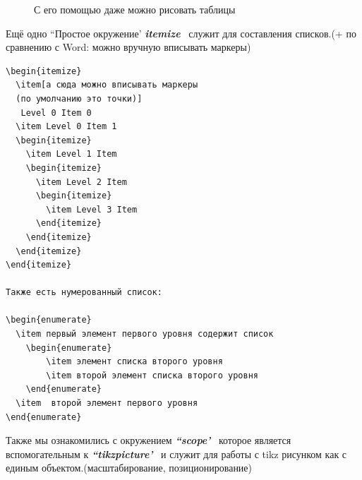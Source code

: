 \documentclass[14pt, a4paper]{extarticle}
\begin{document}
\begin{figure}[h!]
\setlength{\fboxsep}{0pt}%
\setlength{\fboxrule}{2pt}%
%
\caption{С его помощью даже можно рисовать таблицы}
\end{figure}

Ещё одно ``Простое окружение' \textsl{\textbf{itemize}} \ служит для составления списков.(+ по сравнению с Word: можно вручную вписывать маркеры)
\begin{verbatim}
\begin{itemize}
  \item[а сюда можно вписывать маркеры
  (по умолчанию это точки)]
   Level 0 Item 0 
  \item Level 0 Item 1 
  \begin{itemize}
    \item Level 1 Item
    \begin{itemize}
      \item Level 2 Item
      \begin{itemize}
        \item Level 3 Item
      \end{itemize}
    \end{itemize}
  \end{itemize}
\end{itemize}

Также есть нумерованный список:

\begin{enumerate} 
  \item первый элемент первого уровня содержит список 
    \begin{enumerate} 
        \item элемент списка второго уровня
        \item второй элемент списка второго уровня
    \end{enumerate} 
  \item  второй элемент первого уровня
\end{enumerate} 
\end{verbatim}



Также мы ознакомились с окружением \textit{\textbf{``scope'}} \ которое является вспомогательным к \textit{\textbf{``tikzpicture'}} \ и служит для работы с tikz рисунком как с единым объектом.(масштабирование, позиционирование)
\end{document}
